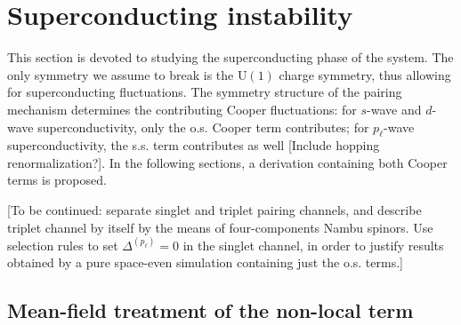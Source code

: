 \section{Superconducting instability}

This section is devoted to studying the superconducting phase of the system. The only symmetry we assume to break is the $\mathrm{U}(1)$ charge symmetry, thus allowing for superconducting fluctuations. The symmetry structure of the pairing mechanism determines the contributing Cooper fluctuations: for $s$-wave and $d$-wave superconductivity, only the o.s. Cooper term contributes; for $p_\ell$-wave superconductivity, the s.s. term contributes as well {\color{tabred}[Include hopping renormalization?]}. In the following sections, a derivation containing both Cooper terms is proposed.

{\color{tabred}
	[To be continued: separate singlet and triplet pairing channels, and describe triplet channel by itself by the means of four-components Nambu spinors. Use selection rules to set $\Delta^{(p_\ell)}=0$ in the singlet channel, in order to justify results obtained by a pure space-even simulation containing just the o.s. terms.]
}

\subsection{Mean-field treatment of the non-local term}

